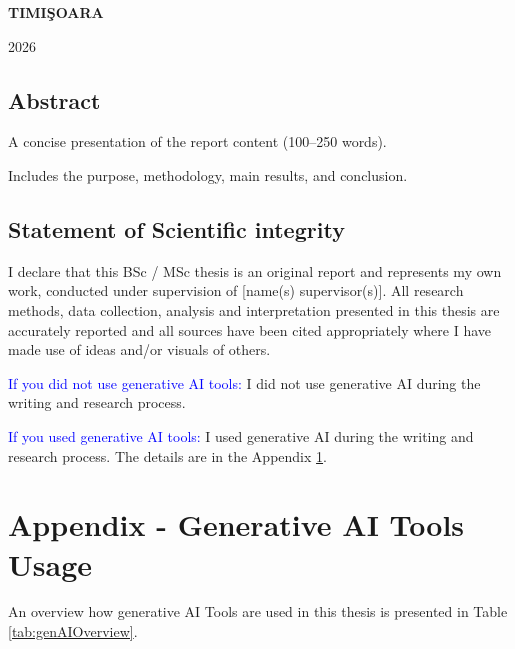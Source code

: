 \documentclass[12pt,a4paper]{book}
\theoremstyle{definition}
\theoremstyle{remark}
\begin{document}
\vfill
\begin{center}
{\bf TIMI\c SOARA

2026}
\end{center}

\newpage
\normalsize{}

\section*{Abstract} 
A concise presentation of the report content (100–250 words).


\noindent Includes the purpose, methodology, main results, and conclusion.


\newpage

\section*{Statement of Scientific integrity} 

I declare that this BSc / MSc thesis is an original report and represents my own work, conducted under supervision of [name(s) supervisor(s)]. All research methods, data collection, analysis and interpretation presented in this thesis are accurately reported and all sources have been cited appropriately where I have made use of ideas and/or visuals of others.

\textcolor{blue}{If you did not use generative AI tools:} I did not use generative AI during the writing and research process.

\textcolor{blue}{If you used generative AI tools:} I used generative AI during the writing and research process. The details are in the Appendix \ref{genAIUsage}.




\newpage
\normalsize{}

\tableofcontents








\appendix
\chapter{Appendix - Generative AI Tools Usage}
\label{genAIUsage}

An overview how  generative AI Tools are used in this thesis is presented in Table \ref{tab:genAIOverview}.
\end{document}
